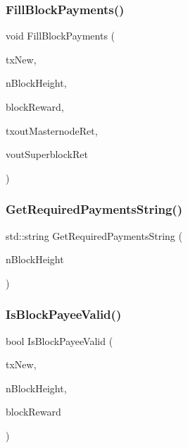 \subsubsection{\texorpdfstring{Fill\+Block\+Payments()}{FillBlockPayments()}}
{\footnotesize\ttfamily void Fill\+Block\+Payments (\begin{DoxyParamCaption}\item[{C\+Mutable\+Transaction \&}]{tx\+New,  }\item[{int}]{n\+Block\+Height,  }\item[{\mbox{\hyperlink{amount_8h_a4eaf3a5239714d8c45b851527f7cb564}{C\+Amount}}}]{block\+Reward,  }\item[{C\+Tx\+Out \&}]{txout\+Masternode\+Ret,  }\item[{std\+::vector$<$ C\+Tx\+Out $>$ \&}]{vout\+Superblock\+Ret }\end{DoxyParamCaption})}

\mbox{\label{masternode-payments_8h_a7828ab0b9a1302db35b658f727b260e1}} 
\subsubsection{\texorpdfstring{Get\+Required\+Payments\+String()}{GetRequiredPaymentsString()}}
{\footnotesize\ttfamily std\+::string Get\+Required\+Payments\+String (\begin{DoxyParamCaption}\item[{int}]{n\+Block\+Height }\end{DoxyParamCaption})}

\mbox{\label{masternode-payments_8h_a26df8e859f425afc3af5448f582c8dd5}} 
\subsubsection{\texorpdfstring{Is\+Block\+Payee\+Valid()}{IsBlockPayeeValid()}}
{\footnotesize\ttfamily bool Is\+Block\+Payee\+Valid (\begin{DoxyParamCaption}\item[{const C\+Transaction \&}]{tx\+New,  }\item[{int}]{n\+Block\+Height,  }\item[{\mbox{\hyperlink{amount_8h_a4eaf3a5239714d8c45b851527f7cb564}{C\+Amount}}}]{block\+Reward }\end{DoxyParamCaption})}


